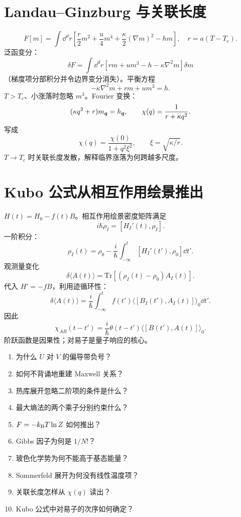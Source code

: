 \section{Landau--Ginzburg 与关联长度}
\[
F[m]=\int\dd^dr\left[
\frac r2m^2+\frac u4m^4+\frac\kappa2(\nabla m)^2-hm
\right],
\quad r=a(T-T_c).
\]
泛函变分：
\[
\delta F=\int\dd^dr[
rm+um^3-h-\kappa\nabla^2m]\delta m
\]
（梯度项分部积分并令边界变分消失）。平衡方程
\[
\boxed{-\kappa\nabla^2m+rm+um^3=h}.
\]
$T>T_c$、小涨落时忽略 $m^3$。Fourier 变换：
\[
(\kappa q^2+r)m_{\bm{q}}=h_{\bm{q}},
\qquad
\chi(q)=\frac1{r+\kappa q^2}.
\]
写成
\[
\chi(q)=\frac{\chi(0)}{1+q^2\xi^2},
\qquad
\boxed{\xi=\sqrt{\kappa/r}}.
\]
$T\to T_c$ 时关联长度发散，解释临界涨落为何跨越多尺度。

\section{Kubo 公式从相互作用绘景推出}
$H(t)=H_0-f(t)B$。相互作用绘景密度矩阵满足
\[
i\hbar\dot\rho_I=[H_I'(t),\rho_I].
\]
一阶积分：
\[
\rho_I(t)=\rho_0-\frac{i}{\hbar}
\int_{-\infty}^t[H_I'(t'),\rho_0]\dd t'.
\]
观测量变化
\[
\delta\langle A(t)\rangle
=\mathrm{Tr}[(\rho_I(t)-\rho_0)A_I(t)].
\]
代入 $H'=-fB$，利用迹循环性：
\[
\delta\langle A(t)\rangle
=\frac{i}{\hbar}\int_{-\infty}^t
f(t')\langle[B_I(t'),A_I(t)]\rangle_0\dd t'.
\]
因此
\[
\boxed{\chi_{AB}(t-t')
=\frac{i}{\hbar}\theta(t-t')
\langle[B(t'),A(t)]\rangle_0}.
\]
阶跃函数是因果性；对易子是量子响应的核心。

\begin{selftestbox}
\begin{enumerate}
\item 为什么 $U$ 对 $V$ 的偏导带负号？
\item 如何不背诵地重建 Maxwell 关系？
\item 热库展开忽略二阶项的条件是什么？
\item 最大熵法的两个乘子分别约束什么？
\item $F=-k_{\mathrm B} T\ln Z$ 如何推出？
\item Gibbs 因子为何是 $1/N!$？
\item 玻色化学势为何不能高于基态能量？
\item Sommerfeld 展开为何没有线性温度项？
\item 关联长度怎样从 $\chi(q)$ 读出？
\item Kubo 公式中对易子的次序如何确定？
\end{enumerate}
\end{selftestbox}
